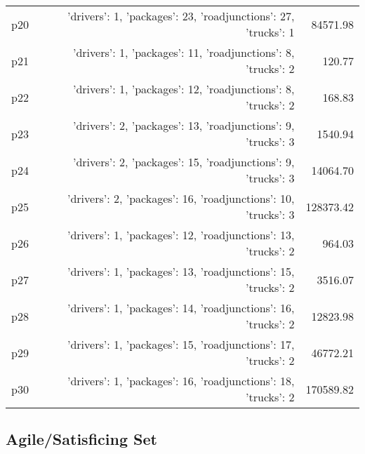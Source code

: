 \documentclass{article}
\begin{document}
\begin{center}
\begin{tabular}{@{}l|r|r@{}}
  p20&{'drivers': 1, 'packages': 23, 'roadjunctions': 27, 'trucks': 1}&84571.98\\
  p21&{'drivers': 1, 'packages': 11, 'roadjunctions': 8, 'trucks': 2}&120.77\\
  p22&{'drivers': 1, 'packages': 12, 'roadjunctions': 8, 'trucks': 2}&168.83\\
  p23&{'drivers': 2, 'packages': 13, 'roadjunctions': 9, 'trucks': 3}&1540.94\\
  p24&{'drivers': 2, 'packages': 15, 'roadjunctions': 9, 'trucks': 3}&14064.70\\
  p25&{'drivers': 2, 'packages': 16, 'roadjunctions': 10, 'trucks': 3}&128373.42\\
  p26&{'drivers': 1, 'packages': 12, 'roadjunctions': 13, 'trucks': 2}&964.03\\
  p27&{'drivers': 1, 'packages': 13, 'roadjunctions': 15, 'trucks': 2}&3516.07\\
  p28&{'drivers': 1, 'packages': 14, 'roadjunctions': 16, 'trucks': 2}&12823.98\\
  p29&{'drivers': 1, 'packages': 15, 'roadjunctions': 17, 'trucks': 2}&46772.21\\
  p30&{'drivers': 1, 'packages': 16, 'roadjunctions': 18, 'trucks': 2}&170589.82
                            \end{tabular}
                            \end{center}
                    

                                \subsection*{Agile/Satisficing Set}
                                
\end{document}
